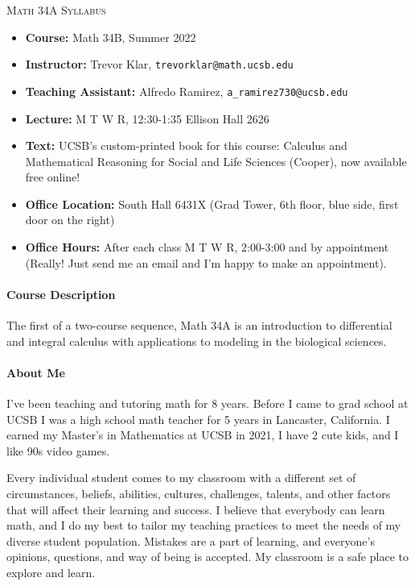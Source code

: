 \documentclass[a4paper,12pt]{article}
\begin{document}
\begin{center} {\Large \scshape Math 34A Syllabus}
\end{center}

\vspace{0.75cm}

\begin{itemize}
\item {\bf Course:} Math 34B, Summer 2022
\item {\bf Instructor:} Trevor Klar, \texttt{trevorklar@math.ucsb.edu}
\item {\bf Teaching Assistant:} Alfredo Ramirez, \texttt{a\_ramirez730@ucsb.edu}
\item {\bf Lecture:} M T W R, 12:30-1:35 Ellison Hall 2626
\item {\bf Text:} UCSB's custom-printed book for this course: Calculus and Mathematical Reasoning for Social and Life Sciences (Cooper), now available free online!
\item {\bf Office Location:} South Hall 6431X (Grad Tower, 6th floor, blue side, first door on the right)
\item {\bf Office Hours:} After each class M T W R, 2:00-3:00 and by appointment (Really! Just send me an email and I'm happy to make an appointment).
\end{itemize}

\paragraph{Course Description}
The first of a two-course sequence, Math 34A is an introduction to differential and integral calculus with applications to modeling in the biological sciences.

\paragraph{About Me}
I’ve been teaching and tutoring math for 8 years. Before I came to grad school at UCSB I was a high school math teacher for 5 years in Lancaster, California. I earned my Master’s in Mathematics at UCSB in 2021, I have 2 cute kids, and I like 90s video games.

Every individual student comes to my classroom with a different set of circumstances, beliefs, abilities, cultures, challenges, talents, and other factors that will affect their learning and success. I believe that everybody can learn math, and I do my best to tailor my teaching practices to meet the needs of my diverse student population. Mistakes are a part of learning, and everyone's opinions, questions, and way of being is accepted. My classroom is a safe place to explore and learn. 
\end{document}
